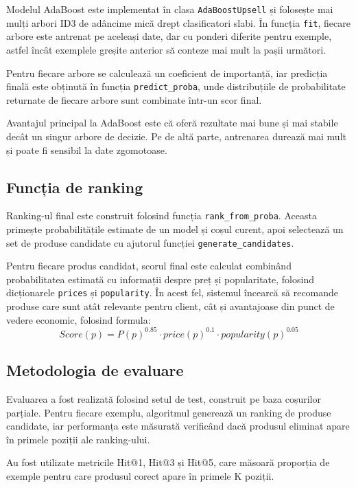 \documentclass[12pt,a4paper]{article}
\begin{document}
Modelul AdaBoost este implementat în clasa \texttt{AdaBoostUpsell} și folosește mai mulți arbori ID3 de adâncime mică drept clasificatori slabi. În funcția \texttt{fit}, fiecare arbore este antrenat pe aceleași date, dar cu ponderi diferite pentru exemple, astfel încât exemplele greșite anterior să conteze mai mult la pașii următori.

Pentru fiecare arbore se calculează un coeficient de importanță, iar predicția finală este obținută în funcția \texttt{predict\_proba}, unde distribuțiile de probabilitate returnate de fiecare arbore sunt combinate într-un scor final.

Avantajul principal la AdaBoost este că oferă rezultate mai bune și mai stabile decât un singur arbore de decizie. Pe de altă parte, antrenarea durează mai mult și poate fi sensibil la date zgomotoase.


\subsection{Funcția de ranking}

Ranking-ul final este construit folosind funcția \texttt{rank\_from\_proba}. Aceasta primește probabilitățile estimate de un model și coșul curent, apoi selectează un set de produse candidate cu ajutorul funcției \texttt{generate\_candidates}.

Pentru fiecare produs candidat, scorul final este calculat combinând probabilitatea estimată cu informații despre preț și popularitate, folosind dicționarele \texttt{prices} și \texttt{popularity}. În acest fel, sistemul încearcă să recomande produse care sunt atât relevante pentru client, cât și avantajoase din punct de vedere economic, folosind formula:
\[
Score(p) = P(p)^{0.85} \cdot price(p)^{0.1} \cdot popularity(p)^{0.05}
\]


\subsection{Metodologia de evaluare}

Evaluarea a fost realizată folosind setul de test, construit pe baza coșurilor parțiale. Pentru fiecare exemplu, algoritmul generează un ranking de produse candidate, iar performanța este măsurată verificând dacă produsul eliminat apare în primele poziții ale ranking-ului.

Au fost utilizate metricile Hit@1, Hit@3 și Hit@5, care măsoară proporția de exemple pentru care produsul corect apare în primele K poziții.
\end{document}
